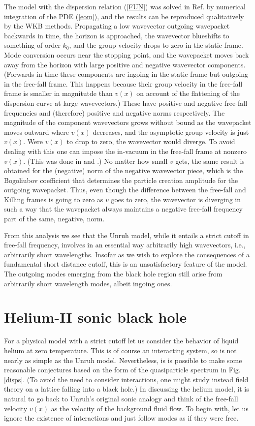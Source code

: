 \documentclass[12pt]{article}
\begin{document}
The model with the dispersion relation (\ref{FUN}) was solved in Ref.
\cite{Unruh2} by numerical integration of the PDE (\ref{eom}), and the
results can be reproduced qualitatively by the WKB methods. Propagating
a low wavevector outgoing wavepacket backwards in time, the horizon is
approached, the wavevector blueshifts to something of order $k_0$, and
the group velocity drops to zero in the static frame.  Mode conversion
occurs near the stopping point\cite{Jaco-mex,CorlJaco}, and the
wavepacket moves back away from the horizon with large positive and
negative wavevector components. (Forwards in time these components are
ingoing in the static frame but outgoing in the free-fall frame. This
happens because their group velocity in the free-fall frame is smaller
in magnitutde than $v(x)$ on account of the flattening of the
dispersion curve at large wavevectors.) These have positive and
negative free-fall frequencies and (therefore) positive and negative
norms respectively.  The magnitude of the component wavevectors grows
without bound as the wavepacket moves outward where $v(x)$ decreases,
and the asymptotic group velocity is just $v(x)$.  Were $v(x)$ to drop
to zero, the wavevector would diverge.  To avoid dealing with this one
can impose the in-vacuum in the free-fall frame at nonzero $v(x)$.
(This was done in \cite{Unruh2} and \cite{CorlJaco}.) No matter how
small $v$ gets, the same result is obtained for the (negative) norm of
the negative wavevector piece, which is the Bogoliubov coefficient that
determines the particle creation amplitude for the outgoing
wavepacket.  Thus, even though the difference between the free-fall and
Killing frames is going to zero as $v$ goes to zero, the wavevector is
diverging in such a way that the wavepacket always maintains a negative
free-fall frequency part of the same, negative, norm.

{}From this analysis we see that the Unruh model, while it entails a
strict cutoff in free-fall frequency, involves in an essential way
arbitrarily high wavevectors, i.e., arbitrarily short wavelengths.
Insofar as we wish to explore the consequences of a fundamental short
distance cutoff, this is an unsatisfactory feature of the model. The
outgoing modes emerging from the black hole region still arise from
arbitrarily short wavelength modes, albeit ingoing ones.

\section{Helium-II sonic black hole} 
For a physical model with a strict
cutoff let us consider the behavior of liquid helium at zero
temperature. This is of course an interacting system, so is not nearly
as simple as the Unruh model. Nevertheless, is is possible to make some
reasonable conjectures based on the form of the quasiparticle spectrum
in Fig. \ref{disps}.  (To avoid the need to consider interactions, one
might study instead field theory on a lattice falling into a black
hole.) In discussing the helium model, it is natural to go back to
Unruh's original sonic analogy and think of the free-fall velocity
$v(x)$  as the velocity of the background fluid flow. To begin with,
let us ignore the existence of interactions and just follow modes as if
they were free.
\end{document}
